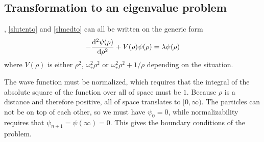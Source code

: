 \documentclass[12pt,english,a4paper]{report}
\begin{document}

\subsection{Transformation to an eigenvalue problem}
, \ref{slutento} and \ref{slmedto} can all be written on the generic form
\[
-\dv[2]{\psi(\rho)}{\rho} + V(\rho)\psi(\rho) = \lambda\psi(\rho)
\]
where \(V(\rho)\) is either \(\rho^2\), \(\omega_r^2\rho^2\) or \(\omega_r^2\rho^2+1/\rho\) depending on the situation.

The wave function must be normalized, which requires that the integral of the absolute square of the function over all of space must be \(1\). Because \(\rho\) is a distance and therefore positive, all of space translates to \([0,\infty)\). The particles can not be on top of each other, so we must have \(\psi_0=0\), while normalizability requires that \(\psi_{n+1}=\psi(\infty)=0\). This gives the boundary conditions of the problem.
\end{document}
